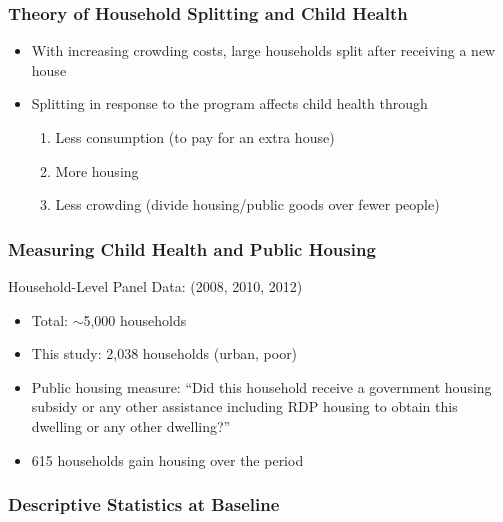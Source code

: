 \documentclass[aspectratio=149]{beamer}
\begin{document}
\begin{frame}
\frametitle{Theory of Household Splitting and Child Health}
\begin{itemize}
  \item With increasing crowding costs, large households split after receiving a new house
  \vspace{.1cm}
  \item Splitting in response to the program affects child health through
    \begin{enumerate}
      \item Less consumption (to pay for an extra house)
      \item More housing
      \item Less crowding (divide housing/public goods over fewer people)
    \end{enumerate}
\end{itemize}
\end{frame}


\begin{frame}
\frametitle{Measuring Child Health and Public Housing}

Household-Level Panel Data: (2008, 2010, 2012)
\begin{itemize}
  \item Total: $\sim$5,000 households
  \item This study: 2,038 households (urban, poor) 
  \item Public housing measure: ``Did this household receive a government housing subsidy or any other assistance including RDP housing to obtain this dwelling or any other dwelling?''
  \item 615 households gain housing over the period
\end{itemize}
\end{frame}


\begin{frame}
\frametitle{Descriptive Statistics at Baseline}
\begin{center}

\end{center}
\end{frame}






\end{document}
